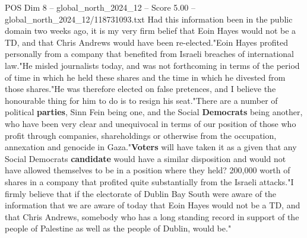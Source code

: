 \begin{textsample}{POS Dim 8 – global\_north\_2024\_12 – Score 5.00 – global\_north\_2024\_12/118731093.txt}
Had this information been in the public domain two weeks ago, it is my very firm belief that Eoin Hayes would not be a TD, and that Chris Andrews would have been re-elected."Eoin Hayes profited personally from a company that benefited from Israeli breaches of international law."He misled journalists today, and was not forthcoming in terms of the period of time in which he held these shares and the time in which he divested from those shares."He was therefore elected on false pretences, and I believe the honourable thing for him to do is to resign his seat."There are a number of political \textbf{parties}, Sinn Fein being one, and the Social \textbf{Democrats} being another, who have been very clear and unequivocal in terms of our position of those who profit through companies, shareholdings or otherwise from the occupation, annexation and genocide in Gaza."\textbf{Voters} will have taken it as a given that any Social Democrats \textbf{candidate} would have a similar disposition and would not have allowed themselves to be in a position where they held? 200,000 worth of shares in a company that profited quite substantially from the Israeli attacks."I firmly believe that if the electorate of Dublin Bay South were aware of the information that we are aware of today that Eoin Hayes would not be a TD, and that Chris Andrews, somebody who has a long standing record in support of the people of Palestine as well as the people of Dublin, would be."

\end{textsample}
